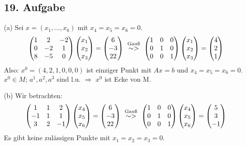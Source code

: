 \documentclass[a4paper,11pt,twoside,titlepage]{article}
\begin{document}
\subsection*{19. Aufgabe}
(a) Sei $x=(x_1,\ldots,x_6)$ mit $x_4=x_5=x_6=0$.
\[\begin{pmatrix}1&2&-2\\0&-2&1\\8&-5&0\end{pmatrix}\begin{pmatrix}x_1\\x_2\\x_3\end{pmatrix}=\begin{pmatrix}6\\-3\\22\end{pmatrix}\ \stackrel{\textnormal{\scriptsize{Gauß}}}{\sim>}\ 
\begin{pmatrix}1&0&0\\0&1&0\\0&0&1\end{pmatrix}\begin{pmatrix}x_1\\x_2\\x_3\end{pmatrix}=\begin{pmatrix}4\\2\\1\end{pmatrix}\]
Also: $x^0=(4,2,1,0,0,0)$ ist einziger Punkt mit $Ax=b$ und $x_4=x_5=x_6=0$. $x^0\in M$; $a^1,a^2,a^3$ sind l.u. $\Rightarrow$ $x^0$ ist Ecke von M.

(b) Wir betrachten:
\[\begin{pmatrix}1&1&2\\-1&1&1\\3&2&-1\end{pmatrix}\begin{pmatrix}x_4\\x_5\\x_6\end{pmatrix}=\begin{pmatrix}6\\-3\\22\end{pmatrix}\ \stackrel{\textnormal{\scriptsize{Gauß}}}{\sim>}\ 
\begin{pmatrix}1&0&0\\0&1&0\\0&0&1\end{pmatrix}\begin{pmatrix}x_4\\x_5\\x_6\end{pmatrix}=\begin{pmatrix}5\\3\\-1\end{pmatrix}\]
Es gibt keine zulässigen Punkte mit $x_1=x_2=x_3=0$.
\end{document}
